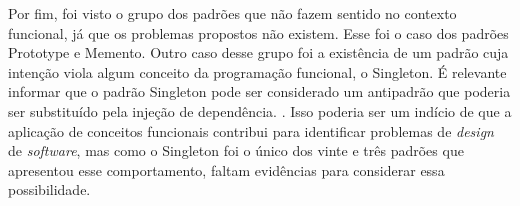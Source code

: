 Por fim, foi visto o grupo dos padrões 
que não fazem sentido no contexto funcional, 
já que os problemas propostos não existem. 
Esse foi o caso dos padrões Prototype e Memento.
Outro caso desse grupo foi a existência de 
um padrão cuja intenção viola algum conceito da 
programação funcional, o Singleton. 
É relevante informar que o padrão Singleton 
pode ser considerado um antipadrão que poderia 
ser substituído pela injeção de dependência.
\cite{singletonantipattern}. Isso poderia 
ser um indício de que a aplicação de 
conceitos funcionais contribui para 
identificar problemas de \textit{design} de 
\textit{software}, mas como o Singleton 
foi o único dos vinte e três padrões que 
apresentou esse comportamento, faltam 
evidências para considerar essa 
possibilidade.


